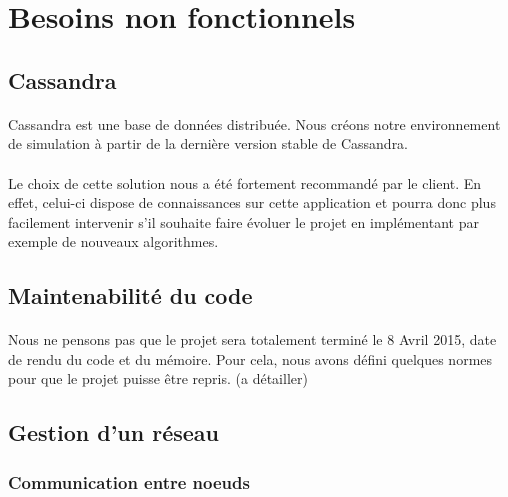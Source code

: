 \documentclass[12pt]{article}
\begin{document}
\newpage

\section{Besoins non fonctionnels}

\subsection{Cassandra}

\paragraph{} Cassandra est une base de données distribuée.
Nous créons notre environnement de simulation à partir de la dernière version stable de Cassandra.

\paragraph{} Le choix de cette solution nous a été fortement recommandé par le client.
En effet, celui-ci dispose de connaissances sur cette application et pourra donc plus facilement intervenir s'il souhaite faire évoluer le projet en implémentant par exemple de nouveaux algorithmes.



\subsection{Maintenabilité du code}

\paragraph{} Nous ne pensons pas que le projet sera totalement terminé le 8 Avril 2015, date de rendu du code et du mémoire.
Pour cela, nous avons défini quelques normes pour que le projet puisse être repris. (a détailler)

\paragraph{}



\subsection{Gestion d'un réseau}

\subsubsection{Communication entre noeuds}
\end{document}
